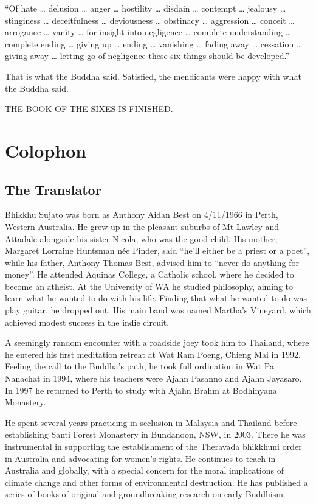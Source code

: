 \documentclass[12pt,openany]{book}%
\newcommand*{\scendbook}[1]{\begin{center}\uppercase{#1}\end{center}}
\let\oldbackmatter\backmatter
\renewcommand{\backmatter}{%
\chapterfont{\setstretch{.85}\normalfont\centering}%
\sectionfont{\setstretch{.85}\Semiboldsubheadfont}%
\oldbackmatter}
\begin{document}
“Of hate … delusion … anger … hostility … disdain … contempt … jealousy … stinginess … deceitfulness … deviousness … obstinacy … aggression … conceit … arrogance … vanity … for insight into negligence … complete understanding … complete ending … giving up … ending … vanishing … fading away … cessation … giving away … letting go of negligence these six things should be developed.” 

That is what the Buddha said. Satisfied, the mendicants were happy with what the Buddha said. 

\scendbook{The Book of the Sixes is finished. }

%
\backmatter%
\chapter*{Colophon}

\section*{The Translator}

Bhikkhu Sujato was born as Anthony Aidan Best on 4/11/1966 in Perth, Western Australia. He grew up in the pleasant suburbs of Mt Lawley and Attadale alongside his sister Nicola, who was the good child. His mother, Margaret Lorraine Huntsman née Pinder, said “he’ll either be a priest or a poet”, while his father, Anthony Thomas Best, advised him to “never do anything for money”. He attended Aquinas College, a Catholic school, where he decided to become an atheist. At the University of WA he studied philosophy, aiming to learn what he wanted to do with his life. Finding that what he wanted to do was play guitar, he dropped out. His main band was named Martha’s Vineyard, which achieved modest success in the indie circuit. 

A seemingly random encounter with a roadside joey took him to Thailand, where he entered his first meditation retreat at Wat Ram Poeng, Chieng Mai in 1992. Feeling the call to the Buddha’s path, he took full ordination in Wat Pa Nanachat in 1994, where his teachers were Ajahn Pasanno and Ajahn Jayasaro. In 1997 he returned to Perth to study with Ajahn Brahm at Bodhinyana Monastery. 

He spent several years practicing in seclusion in Malaysia and Thailand before establishing Santi Forest Monastery in Bundanoon, NSW, in 2003. There he was instrumental in supporting the establishment of the Theravada bhikkhuni order in Australia and advocating for women’s rights. He continues to teach in Australia and globally, with a special concern for the moral implications of climate change and other forms of environmental destruction. He has published a series of books of original and groundbreaking research on early Buddhism. 
\end{document}
